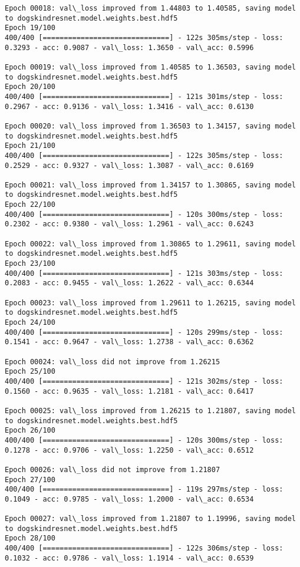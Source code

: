 \documentclass[11pt]{article}
\begin{document}
\begin{Verbatim}[commandchars=\\\{\}]
Epoch 00018: val\_loss improved from 1.44803 to 1.40585, saving model to dogskindresnet.model.weights.best.hdf5
Epoch 19/100
400/400 [==============================] - 122s 305ms/step - loss: 0.3293 - acc: 0.9087 - val\_loss: 1.3650 - val\_acc: 0.5996

Epoch 00019: val\_loss improved from 1.40585 to 1.36503, saving model to dogskindresnet.model.weights.best.hdf5
Epoch 20/100
400/400 [==============================] - 121s 301ms/step - loss: 0.2967 - acc: 0.9136 - val\_loss: 1.3416 - val\_acc: 0.6130

Epoch 00020: val\_loss improved from 1.36503 to 1.34157, saving model to dogskindresnet.model.weights.best.hdf5
Epoch 21/100
400/400 [==============================] - 122s 305ms/step - loss: 0.2529 - acc: 0.9327 - val\_loss: 1.3087 - val\_acc: 0.6169

Epoch 00021: val\_loss improved from 1.34157 to 1.30865, saving model to dogskindresnet.model.weights.best.hdf5
Epoch 22/100
400/400 [==============================] - 120s 300ms/step - loss: 0.2302 - acc: 0.9380 - val\_loss: 1.2961 - val\_acc: 0.6243

Epoch 00022: val\_loss improved from 1.30865 to 1.29611, saving model to dogskindresnet.model.weights.best.hdf5
Epoch 23/100
400/400 [==============================] - 121s 303ms/step - loss: 0.2083 - acc: 0.9455 - val\_loss: 1.2622 - val\_acc: 0.6344

Epoch 00023: val\_loss improved from 1.29611 to 1.26215, saving model to dogskindresnet.model.weights.best.hdf5
Epoch 24/100
400/400 [==============================] - 120s 299ms/step - loss: 0.1541 - acc: 0.9647 - val\_loss: 1.2738 - val\_acc: 0.6362

Epoch 00024: val\_loss did not improve from 1.26215
Epoch 25/100
400/400 [==============================] - 121s 302ms/step - loss: 0.1560 - acc: 0.9635 - val\_loss: 1.2181 - val\_acc: 0.6417

Epoch 00025: val\_loss improved from 1.26215 to 1.21807, saving model to dogskindresnet.model.weights.best.hdf5
Epoch 26/100
400/400 [==============================] - 120s 300ms/step - loss: 0.1278 - acc: 0.9706 - val\_loss: 1.2250 - val\_acc: 0.6512

Epoch 00026: val\_loss did not improve from 1.21807
Epoch 27/100
400/400 [==============================] - 119s 297ms/step - loss: 0.1049 - acc: 0.9785 - val\_loss: 1.2000 - val\_acc: 0.6534

Epoch 00027: val\_loss improved from 1.21807 to 1.19996, saving model to dogskindresnet.model.weights.best.hdf5
Epoch 28/100
400/400 [==============================] - 122s 306ms/step - loss: 0.1032 - acc: 0.9786 - val\_loss: 1.1914 - val\_acc: 0.6539


\end{Verbatim}
\end{document}
